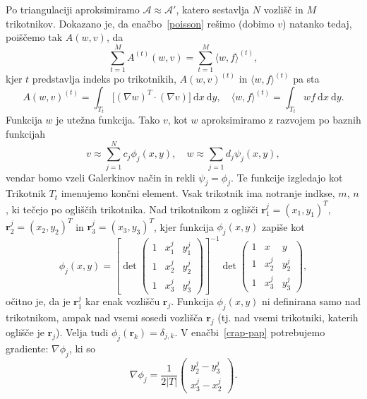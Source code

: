 \documentclass[a4 paper, 12pt]{article}
\renewcommand{\d}{
	\ensuremath{\mathrm{d}}
}
\renewcommand{\r}{
	\ensuremath{\mathbf{r}}
}
\begin{document}
Po triangulaciji aproksimiramo $\mathcal{A} \approx \mathcal{A'}$, katero sestavlja $N$ vozli\v s\v c
in $M$ trikotnikov. Dokazano je, da ena\v cbo~\eqref{poisson} re\v simo (dobimo $v$) natanko tedaj,
poi\v s\v cemo tak $A(w, v)$, da
\begin{equation}
	\sum_{t = 1}^M A^{(t)}(w, v) = \sum_{t = 1}^M \langle w, f \rangle^{(t)},
\end{equation}
kjer $t$ predstavlja indeks po trikotnikih, $A(w,v)^{(t)}$ in $\langle w, f\rangle^{(t)}$ pa sta
\begin{equation}
	A (w, v)^{(t)} = \int_{T_t} \big[(\nabla w)^T \cdot (\nabla v)\big]\ \d x~\d y,\quad
	\langle w, f\rangle^{(t)} = \int_{T_t} w f\ \d x~\d y.
	\label{crap-pap}
\end{equation}
Funkcija $w$ je ute\v zna funkcija. Tako $v$, kot $w$ aproksimiramo z razvojem po baznih funkcijah
\begin{equation}
	v \approx \sum_{j = 1}^N c_j \phi_j (x, y),\quad w \approx \sum_{j = 1} d_j \psi_j (x, y),
\end{equation}
vendar bomo vzeli Galerkinov na\v cin in rekli $\psi_j = \phi_j$. Te funkcije izgledajo kot
Trikotnik $T_t$ imenujemo kon\v cni element. Vsak trikotnik ima notranje indkse, $m$, $n$, ki
te\v cejo po ogli\v s\v cih trikotnika. Nad trikotnikom z ogli\v s\v ci $\r_1^j = (x_1, y_1)^T$,
$\r_2^j = (x_2, y_2)^T$ in $\r_3^j = (x_3, y_3)^T$, kjer funkcija $\phi_j (x,y)$ zapi\v se kot
\begin{equation}
	\phi_j (x,y) = \left[\det \begin{pmatrix}
			1 & x_1^j & y_1^j \\
			1 & x_2^j & y_2^j \\
			1 & x_3^j & y_3^j
		\end{pmatrix} \right]^{-1} \det \begin{pmatrix}
			1 & x     & y     \\
			1 & x_2^j & y_2^j \\
			1 & x_3^j & y_3^j
		\end{pmatrix},
\end{equation}
o\v citno je, da je $\r_1^j$ kar enak vozli\v s\v cu $\r_j$. Funkcija $\phi_j (x,y)$ ni definirana samo
nad trikotnikom, ampak nad vsemi sosedi vozli\v s\v ca $\r_j$ (tj. nad vsemi trikotniki, katerih
ogli\v s\v ce je $\r_j$). Velja tudi $\phi_j (\r_k) = \delta_{j,k}$. V ena\v cbi~\eqref{crap-pap}
potrebujemo gradiente: $\nabla \phi_j$, ki so
\begin{equation}
	\nabla \phi_j = \frac{1}{2|T|} \begin{pmatrix} y^j_2 - y^j_3 \\ x^j_3 - x^j_2 \end{pmatrix}.
\end{equation}
\end{document}
